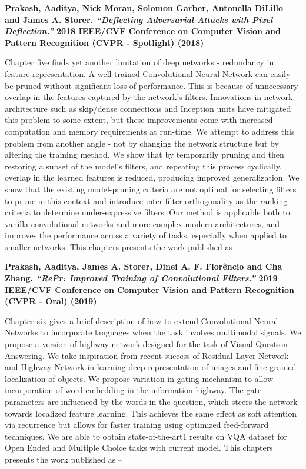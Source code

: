 \noindent\textbf{
Prakash, Aaditya, Nick Moran, Solomon Garber, Antonella DiLillo and James A. Storer. \textit{``Deflecting Adversarial Attacks with Pixel Deflection.''} 2018 IEEE/CVF Conference on Computer Vision and Pattern Recognition (CVPR - Spotlight) (2018)
}
\vspace{2em}

Chapter five finds yet another limitation of deep networks - redundancy in feature representation.
A well-trained Convolutional Neural Network can easily be pruned without significant loss of performance. This is because of unnecessary overlap in the features captured by the network's filters. Innovations in network architecture such as skip/dense connections and Inception units have mitigated this problem to some extent, but these improvements come with increased computation and memory requirements at run-time. We attempt to address this problem from another angle - not by changing the network structure but by altering the training method. We show that by temporarily pruning and then restoring a subset of the model's filters, and repeating this process cyclically, overlap in the learned features is reduced, producing improved generalization. We show that the existing model-pruning criteria are not optimal for selecting filters to prune in this context and introduce inter-filter orthogonality as the ranking criteria to determine under-expressive filters. Our method is applicable both to vanilla convolutional networks and more complex modern architectures, and improves the performance across a variety of tasks, especially when applied to smaller networks.
This chapters presents the work published as --

\noindent\textbf{
Prakash, Aaditya, James A. Storer, Dinei A. F. Florêncio and Cha Zhang. \textit{``RePr: Improved Training of Convolutional Filters.''} 2019 IEEE/CVF Conference on Computer Vision and Pattern Recognition (CVPR - Oral) (2019)
}
\vspace{2em}

Chapter six gives a brief description of how to extend Convolutional Neural Networks to incorporate languages when the task involves multimodal signals.
We propose a version of highway network designed for the task of Visual Question Answering. We take inspiration from recent success of Residual Layer Network and Highway Network in learning deep representation of images and fine grained localization of objects. We propose variation in gating mechanism to allow incorporation of word embedding in the information highway. The gate parameters are influenced by the words in the question, which steers the network towards localized feature learning. This achieves the same effect as soft attention via recurrence but allows for faster training using optimized feed-forward techniques. We are able to obtain state-of-the-art1 results on VQA dataset for Open Ended and Multiple Choice tasks with current model.
This chapters presents the work published as --


